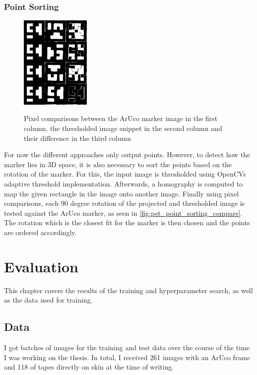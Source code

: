 \documentclass[10pt]{book}
\begin{document}
\subsection{Point Sorting}

\begin{figure}
  \caption{Pixel comparisons between the \ac{ArUco} marker image in the first column, the thresholded image snippet in the second column and their difference in the third column}
  \includegraphics[width=0.3\textwidth]{image/pet_point_sorting_compare}
  \label{fig:pet_point_sorting_compare}
\end{figure}

For now the different approaches only output points. However, to detect how the marker lies in 3D space, it is also necessary to sort the points based on the rotation of the marker. For this, the input image is thresholded using \acp{OpenCV} adaptive threshold implementation. Afterwards, a homography is computed to map the given rectangle in the image onto another image. Finally using pixel comparisons, each 90 degree rotation of the projected and thresholded image is tested against the \ac{ArUco} marker, as seen in \autoref{fig:pet_point_sorting_compare}. The rotation which is the closest fit for the marker is then chosen and the points are ordered accordingly.

\chapter{Evaluation}
\label{chap:eval}

This chapter covers the results of the training and hyperparameter search, as well as the data used for training.

\section{Data}

I got batches of images for the training and test data over the course of the time I was working on the thesis. In total, I received 261 images with an \ac{ArUco} frame and 118 of tapes directly on skin at the time of writing. 
\end{document}

